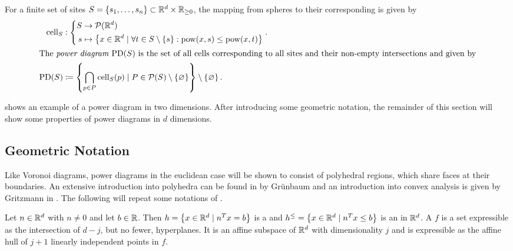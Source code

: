\begin{definition}
    \label{def:powerdiagram}
    For a finite set of sites $S = \left\{ s_1, \dots, s_n \right\} \subset \mathbb{R}^d \times \mathbb{R}_{\geq 0}$, the mapping from spheres to their corresponding  is given by
    \begin{align}
        \operatorname{cell}_S &: \left\{\begin{aligned}
            S &\to \mathcal{P}(\mathbb{R}^d)\\
            s &\mapsto \left\{ x \in \mathbb{R}^d \mid \forall t \in S \setminus \left\{ s \right\}: \operatorname{pow}(x, s) \leq \operatorname{pow}(x, t) \right\}
        \end{aligned}\right..\\
        \intertext{The \emph{power diagram $\operatorname{PD}(S)$} is the set of all cells corresponding to all sites and their non-empty intersections and given by}
        \operatorname{PD}(S) &\coloneqq \left\{ \bigcap_{p \in P} \operatorname{cell}_S(p) \mid P \in \mathcal{P}(S) \setminus \left\{ \varnothing \right\} \right\} \setminus \left\{ \varnothing \right\}.
    \end{align}
\end{definition}

 shows an example of a power diagram in two dimensions.
After introducing some geometric notation, the remainder of this section will show some properties of power diagrams in $d$ dimensions.

\subsection{Geometric Notation}
\label{sub:geometric_notation}
Like Voronoi diagrams, power diagrams in the euclidean case will be shown to consist of polyhedral regions, which share faces at their boundaries.
An extensive introduction into polyhedra can be found in \cite{grunbaum2003convex} by Grünbaum and an introduction into convex analysis is given by Gritzmann in \cite{gritzmann2013grundlagen}.
The following will repeat some notations of \cite{aurenhammer1987power}.

Let $n \in \mathbb{R}^d$ with $n \neq 0$ and let $b \in \mathbb{R}$.
Then $h = \left\{ x \in \mathbb{R}^d \mid n^T x = b \right\}$ is a  and $h^\leq = \left\{ x \in \mathbb{R}^d \mid n^T x \leq b \right\}$ is an  in $\mathbb{R}^d$.
A  $f$ is a set expressible as the intersection of $d - j$, but no fewer, hyperplanes.
It is an affine subspace of $\mathbb{R}^d$ with dimensionality $j$ and is expressible as the affine hull of $j + 1$ linearly independent points in $f$.

